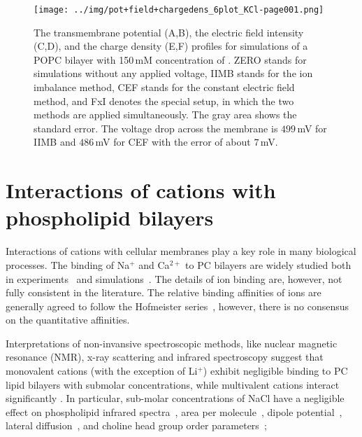 \begin{figure}[btp]
\begin{center}
\texttt{[image: ../img/pot+field+chargedens\_6plot\_KCl-page001.png]}
 \caption{The transmembrane potential (A,B), the electric field intensity (C,D), and the charge density (E,F) profiles for simulations of a POPC bilayer with 150\,mM concentration of . 
ZERO stands for simulations without any applied voltage,
IIMB stands for the ion imbalance method,
CEF  stands for the constant electric field method,
and FxI denotes the special setup, in which the two methods are applied simultaneously. 
The gray area shows the standard error. 
The voltage drop across the membrane is $499\,$mV for IIMB and $486\,$mV for CEF with the error of about $7\,$mV.  
}
\label{fig:potentialKCl}
\end{center}
\end{figure}






\section{Interactions of cations with phospholipid bilayers}

Interactions of cations with cellular membranes play a key role in many biological processes. 
The binding of Na$^+$ and Ca$^{2+}$ to PC bilayers are widely studied both in
experiments~\citep{akutsu81,altenbach84,seelig90,cevc90,tocanne90,binder02,pabst07,uhrikova08}
and simulations~\citep{magarkar2017, bockmann03,bockmann04,berkowitz12,melcrova16,javanainen17, catte16, nmrlipids_proj4}.
The details of ion binding are, however, not fully consistent in the literature.
The relative binding affinities of ions are generally agreed to
follow the Hofmeister series~\citep{eisenberg79,cevc90,tocanne90,binder02,celma07,leontidis09,vacha09a,klasczyk10,harb13}, 
however,
there is no consensus on the quantitative affinities. 

Interpretations of non-invansive spectroscopic methods, like nuclear magnetic resonance (NMR), 
x-ray scattering and infrared spectroscopy suggest that monovalent cations (with the exception of Li$^+$) 
exhibit negligible binding to PC lipid bilayers with submolar concentrations, 
while multivalent cations interact significantly 
\citep{cevc90,tocanne90, hauser76,hauser78,herbette84,altenbach84,uhrikova08}.
In particular, sub-molar concentrations of NaCl have a negligible effect on
phospholipid infrared spectra~\citep{binder02},
area per molecule~\citep{pabst07},
dipole potential~\citep{clarke99},
lateral diffusion~\citep{filippov09},
and choline head group order parameters~\citep{akutsu81};

